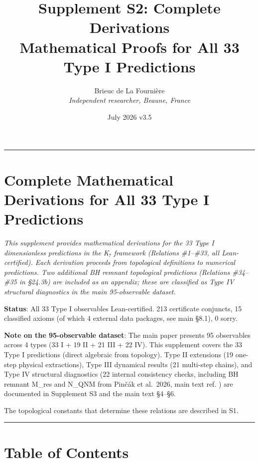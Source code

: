 \documentclass[11pt,a4paper]{article}
\title{%
\LARGE\textbf{Supplement S2: Complete Derivations}\\[0.3em]
\large Mathematical Proofs for All 33 Type I Predictions%
}
\author{Brieuc de La Fourni\`ere \\ \textit{Independent researcher, Beaune, France}}
\date{July 2026 \quad\textbar\quad v3.5}
\begin{document}
\maketitle
\noindent\rule{\textwidth}{0.2pt}

\thispagestyle{fancy}

\section{Complete Mathematical Derivations for All 33 Type I Predictions}\label{complete-mathematical-derivations-for-all-33-type-i-predictions}

\emph{This supplement provides mathematical derivations for the 33 Type I dimensionless predictions in the K₇ framework (Relations \#1--\#33, all Lean-certified). Each derivation proceeds from topological definitions to numerical predictions. Two additional BH remnant topological predictions (Relations \#34--\#35 in §24.3b) are included as an appendix; these are classified as Type IV structural diagnostics in the main 95-observable dataset.}

\textbf{Status}: All 33 Type I observables Lean-certified. 213 certificate conjuncts, 15 classified axioms (of which 4 external data packages, see main §8.1), 0 sorry.

\textbf{Note on the 95-observable dataset}: The main paper presents 95 observables across 4 types (33 I + 19 II + 21 III + 22 IV). This supplement covers the 33 Type I predictions (direct algebraic from topology). Type II extensions (19 one-step physical extractions), Type III dynamical results (21 multi-step chains), and Type IV structural diagnostics (22 internal consistency checks, including BH remnant M\_\allowbreak{}res and N\_\allowbreak{}QNM from Pinčák et al.~2026, main text ref. \cite{42}) are documented in Supplement S3 and the main text §4--§6.

The topological constants that determine these relations are described in S1.

\begin{center}\rule{\linewidth}{0.5pt}\end{center}

\section{Table of Contents}\label{table-of-contents}
\end{document}
